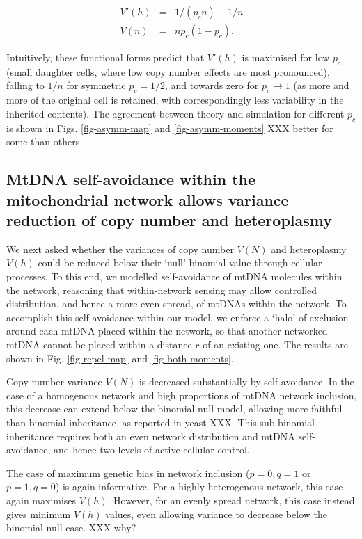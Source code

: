 \documentclass{article}
\begin{document}
\begin{eqnarray*}
  V'(h) & = & 1/(p_c n)  - 1/n \\
  V(n) & = & n p_c (1-p_c).
\end{eqnarray*}

Intuitively, these functional forms predict that $V'(h)$ is maximised for low $p_c$ (small daughter cells, where low copy number effects are most pronounced), falling to $1/n$ for symmetric $p_c = 1/2$, and towards zero for $p_c \rightarrow 1$ (as more and more of the original cell is retained, with correspondingly less variability in the inherited contents). The agreement between theory and simulation for different $p_c$ is shown in Figs. \ref{fig-asymm-map} and \ref{fig-asymm-moments} XXX better for some than others

\subsection*{MtDNA self-avoidance within the mitochondrial network allows variance reduction of copy number and heteroplasmy}
We next asked whether the variances of copy number $V(N)$ and heteroplasmy $V(h)$ could be reduced below their `null' binomial value through cellular processes. To this end, we modelled self-avoidance of mtDNA molecules within the network, reasoning that within-network sensing may allow controlled distribution, and hence a more even spread, of mtDNAs within the network. To accomplish this self-avoidance within our model, we enforce a `halo' of exclusion around each mtDNA placed within the network, so that another networked mtDNA cannot be placed within a distance $r$ of an existing one. The results are shown in Fig. \ref{fig-repel-map} and \ref{fig-both-moments}. 

Copy number variance $V(N)$ is decreased substantially by self-avoidance. In the case of a homogenous network and high proportions of mtDNA network inclusion, this decrease can extend below the binomial null model, allowing more faithful than binomial inheritance, as reported in yeast XXX. This sub-binomial inheritance requires both an even network distribution and mtDNA self-avoidance, and hence two levels of active cellular control. 

The case of maximum genetic bias in network inclusion ($p=0,q=1$ or $p=1,q=0$) is again informative. For a highly heterogenous network, this case again maximises $V(h)$. However, for an evenly spread network, this case instead gives minimum $V(h)$ values, even allowing variance to decrease below the binomial null case. XXX why? 
\end{document}

